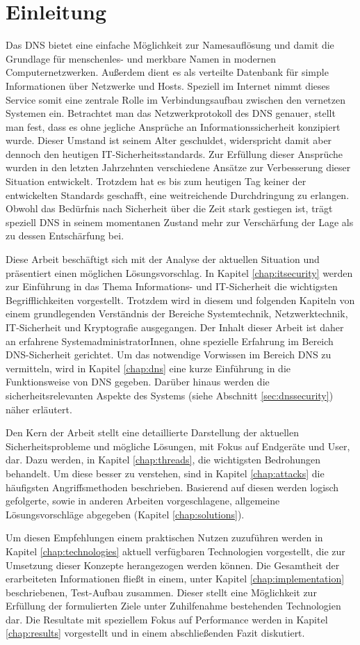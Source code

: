 \chapter{Einleitung}
Das \ac{DNS} bietet eine einfache Möglichkeit zur Namesauflösung und damit die Grundlage für menschenles- und merkbare Namen in modernen Computernetzwerken. Außerdem dient es als verteilte Datenbank für simple Informationen über Netzwerke und Hosts. Speziell im Internet nimmt dieses Service somit eine zentrale Rolle im Verbindungsaufbau zwischen den vernetzen Systemen ein. Betrachtet man das Netzwerkprotokoll des DNS genauer, stellt man fest, dass es ohne jegliche Ansprüche an Informationssicherheit konzipiert wurde. Dieser Umstand ist seinem Alter geschuldet, widerspricht damit aber dennoch den heutigen IT-Sicherheitsstandards. Zur Erfüllung dieser Ansprüche wurden in den letzten Jahrzehnten verschiedene Ansätze zur Verbesserung dieser Situation entwickelt. Trotzdem hat es bis zum heutigen Tag keiner der entwickelten Standards geschafft, eine weitreichende Durchdringung zu erlangen. Obwohl das Bedürfnis nach Sicherheit über die Zeit stark gestiegen ist, trägt speziell DNS in seinem momentanen Zustand mehr zur Verschärfung der Lage als zu dessen Entschärfung bei.

Diese Arbeit beschäftigt sich mit der Analyse der aktuellen Situation und präsentiert einen möglichen Lösungsvorschlag. In Kapitel \ref{chap:itsecurity} werden zur Einführung in das Thema Informations- und IT-Sicherheit die wichtigsten Begrifflichkeiten vorgestellt. Trotzdem wird in diesem und folgenden Kapiteln von einem grundlegenden Verständnis der Bereiche Systemtechnik, Netzwerktechnik, IT-Sicherheit und Kryptografie ausgegangen. Der Inhalt dieser Arbeit ist daher an erfahrene SystemadministratorInnen, ohne spezielle Erfahrung im Bereich DNS-Sicherheit gerichtet. Um das notwendige Vorwissen im Bereich DNS zu vermitteln, wird in Kapitel \ref{chap:dns} eine kurze Einführung in die Funktionsweise von DNS gegeben. Darüber hinaus werden die sicherheitsrelevanten Aspekte des Systems (siehe Abschnitt \ref{sec:dnssecurity}) näher erläutert. 

Den Kern der Arbeit stellt eine detaillierte Darstellung der aktuellen Sicherheitsprobleme und mögliche Lösungen, mit Fokus auf Endgeräte und User, dar. Dazu werden, in Kapitel \ref{chap:threads}, die wichtigsten Bedrohungen behandelt. Um diese besser zu verstehen, sind in Kapitel \ref{chap:attacks} die häufigsten Angriffsmethoden beschrieben. Basierend auf diesen werden logisch gefolgerte, sowie in anderen Arbeiten vorgeschlagene, allgemeine Lösungsvorschläge abgegeben (Kapitel \ref{chap:solutions}). 

Um diesen Empfehlungen einem praktischen Nutzen zuzuführen werden in Kapitel \ref{chap:technologies} aktuell verfügbaren Technologien vorgestellt, die zur Umsetzung dieser Konzepte herangezogen werden können. Die Gesamtheit der erarbeiteten Informationen fließt in einem, unter Kapitel \ref{chap:implementation} beschriebenen, Test-Aufbau zusammen. Dieser stellt eine Möglichkeit zur Erfüllung der formulierten Ziele unter Zuhilfenahme bestehenden Technologien dar. Die Resultate mit speziellem Fokus auf Performance werden in Kapitel \ref{chap:results} vorgestellt und in einem abschließenden Fazit diskutiert.
